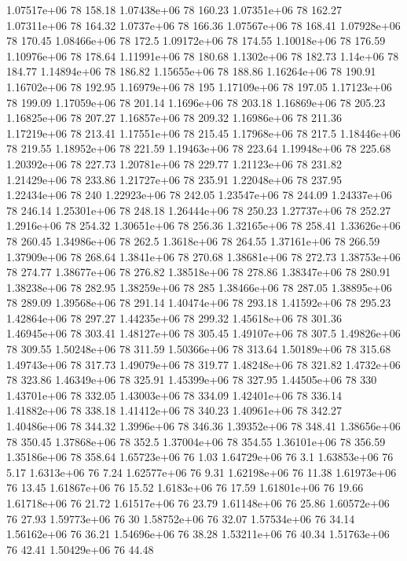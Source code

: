 1.07517e+06 78 158.18
1.07438e+06 78 160.23
1.07351e+06 78 162.27
1.07311e+06 78 164.32
1.0737e+06 78 166.36
1.07567e+06 78 168.41
1.07928e+06 78 170.45
1.08466e+06 78 172.5
1.09172e+06 78 174.55
1.10018e+06 78 176.59
1.10976e+06 78 178.64
1.11991e+06 78 180.68
1.1302e+06 78 182.73
1.14e+06 78 184.77
1.14894e+06 78 186.82
1.15655e+06 78 188.86
1.16264e+06 78 190.91
1.16702e+06 78 192.95
1.16979e+06 78 195
1.17109e+06 78 197.05
1.17123e+06 78 199.09
1.17059e+06 78 201.14
1.1696e+06 78 203.18
1.16869e+06 78 205.23
1.16825e+06 78 207.27
1.16857e+06 78 209.32
1.16986e+06 78 211.36
1.17219e+06 78 213.41
1.17551e+06 78 215.45
1.17968e+06 78 217.5
1.18446e+06 78 219.55
1.18952e+06 78 221.59
1.19463e+06 78 223.64
1.19948e+06 78 225.68
1.20392e+06 78 227.73
1.20781e+06 78 229.77
1.21123e+06 78 231.82
1.21429e+06 78 233.86
1.21727e+06 78 235.91
1.22048e+06 78 237.95
1.22434e+06 78 240
1.22923e+06 78 242.05
1.23547e+06 78 244.09
1.24337e+06 78 246.14
1.25301e+06 78 248.18
1.26444e+06 78 250.23
1.27737e+06 78 252.27
1.2916e+06 78 254.32
1.30651e+06 78 256.36
1.32165e+06 78 258.41
1.33626e+06 78 260.45
1.34986e+06 78 262.5
1.3618e+06 78 264.55
1.37161e+06 78 266.59
1.37909e+06 78 268.64
1.3841e+06 78 270.68
1.38681e+06 78 272.73
1.38753e+06 78 274.77
1.38677e+06 78 276.82
1.38518e+06 78 278.86
1.38347e+06 78 280.91
1.38238e+06 78 282.95
1.38259e+06 78 285
1.38466e+06 78 287.05
1.38895e+06 78 289.09
1.39568e+06 78 291.14
1.40474e+06 78 293.18
1.41592e+06 78 295.23
1.42864e+06 78 297.27
1.44235e+06 78 299.32
1.45618e+06 78 301.36
1.46945e+06 78 303.41
1.48127e+06 78 305.45
1.49107e+06 78 307.5
1.49826e+06 78 309.55
1.50248e+06 78 311.59
1.50366e+06 78 313.64
1.50189e+06 78 315.68
1.49743e+06 78 317.73
1.49079e+06 78 319.77
1.48248e+06 78 321.82
1.4732e+06 78 323.86
1.46349e+06 78 325.91
1.45399e+06 78 327.95
1.44505e+06 78 330
1.43701e+06 78 332.05
1.43003e+06 78 334.09
1.42401e+06 78 336.14
1.41882e+06 78 338.18
1.41412e+06 78 340.23
1.40961e+06 78 342.27
1.40486e+06 78 344.32
1.3996e+06 78 346.36
1.39352e+06 78 348.41
1.38656e+06 78 350.45
1.37868e+06 78 352.5
1.37004e+06 78 354.55
1.36101e+06 78 356.59
1.35186e+06 78 358.64
1.65723e+06 76 1.03
1.64729e+06 76 3.1
1.63853e+06 76 5.17
1.6313e+06 76 7.24
1.62577e+06 76 9.31
1.62198e+06 76 11.38
1.61973e+06 76 13.45
1.61867e+06 76 15.52
1.6183e+06 76 17.59
1.61801e+06 76 19.66
1.61718e+06 76 21.72
1.61517e+06 76 23.79
1.61148e+06 76 25.86
1.60572e+06 76 27.93
1.59773e+06 76 30
1.58752e+06 76 32.07
1.57534e+06 76 34.14
1.56162e+06 76 36.21
1.54696e+06 76 38.28
1.53211e+06 76 40.34
1.51763e+06 76 42.41
1.50429e+06 76 44.48
